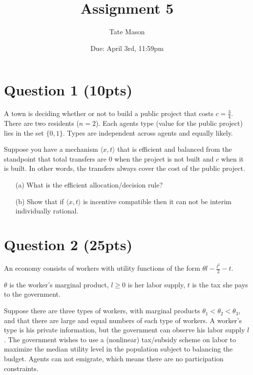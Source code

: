 \documentclass[10pt,a4paper]{article}
\begin{document}
\title{Assignment 5}
\author{Tate Mason}
\date{Due: April 3rd, 11:59pm}
\maketitle

\section*{Question 1 (10pts)}
  A town is deciding whether or not to build a public project that costs $c = \frac{3}{4}$. There are two residents ($n = 2$). Each agents type (value for the public project) lies in the set $\{0,1\}$. Types are independent across agents and equally likely.

  Suppose you have a mechanism $\langle x, t \rangle$ that is efficient and balanced from the standpoint that total transfers are 0 when the project is not built and $c$ when it is built. In other words, the transfers always cover the cost of the public project.

  \begin{enumerate}
      \item[(a)] What is the efficient allocation/decision rule?
      \item[(b)] Show that if $\langle x, t \rangle$ is incentive compatible then it can not be interim individually rational.
  \end{enumerate}

\section*{Question 2 (25pts)}
  An economy consists of workers with utility functions of the form $\theta l - \frac{l^2}{2} - t$.

  $\theta$ is the worker's marginal product, $l \geq 0$ is her labor supply, $t$ is the tax she pays to the government.

  Suppose there are three types of workers, with marginal products $\theta_1 < \theta_2 < \theta_3$, and that there are large and equal numbers of each type of workers. A worker's type is his private information, but the government can observe his labor supply $l$. The government wishes to use a (nonlinear) tax/subsidy scheme on labor to maximize the median utility level in the population subject to balancing the budget. Agents can not emigrate, which means there are no participation constraints.
\end{document}
